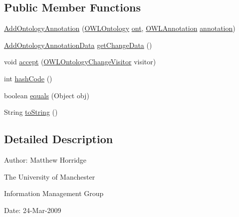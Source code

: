 \subsection*{Public Member Functions}
\begin{DoxyCompactItemize}
\item 
\hyperlink{classorg_1_1semanticweb_1_1owlapi_1_1model_1_1_add_ontology_annotation_a0f46a05b9e2e996d296d452b4db5042c}{Add\-Ontology\-Annotation} (\hyperlink{interfaceorg_1_1semanticweb_1_1owlapi_1_1model_1_1_o_w_l_ontology}{O\-W\-L\-Ontology} \hyperlink{classorg_1_1semanticweb_1_1owlapi_1_1model_1_1_o_w_l_ontology_change_a9b8b64f1cab33aae500db20e19186211}{ont}, \hyperlink{interfaceorg_1_1semanticweb_1_1owlapi_1_1model_1_1_o_w_l_annotation}{O\-W\-L\-Annotation} \hyperlink{classorg_1_1semanticweb_1_1owlapi_1_1model_1_1_annotation_change_a82541adcd6969af37b2d2c2663e7f69c}{annotation})
\item 
\hyperlink{classorg_1_1semanticweb_1_1owlapi_1_1change_1_1_add_ontology_annotation_data}{Add\-Ontology\-Annotation\-Data} \hyperlink{classorg_1_1semanticweb_1_1owlapi_1_1model_1_1_add_ontology_annotation_ad8d3980c8db90f8a94f7991ddfb53d11}{get\-Change\-Data} ()
\item 
void \hyperlink{classorg_1_1semanticweb_1_1owlapi_1_1model_1_1_add_ontology_annotation_a4b2e4593d2e963e70b7d0922edfb0421}{accept} (\hyperlink{interfaceorg_1_1semanticweb_1_1owlapi_1_1model_1_1_o_w_l_ontology_change_visitor}{O\-W\-L\-Ontology\-Change\-Visitor} visitor)
\item 
int \hyperlink{classorg_1_1semanticweb_1_1owlapi_1_1model_1_1_add_ontology_annotation_a61dd086ae34e13207b1f60fdb4b716cc}{hash\-Code} ()
\item 
boolean \hyperlink{classorg_1_1semanticweb_1_1owlapi_1_1model_1_1_add_ontology_annotation_a7c8e6b3f6a7c257bc3481c230ac7a525}{equals} (Object obj)
\item 
String \hyperlink{classorg_1_1semanticweb_1_1owlapi_1_1model_1_1_add_ontology_annotation_a3f83e0db974654ced714239fec02ea2c}{to\-String} ()
\end{DoxyCompactItemize}


\subsection{Detailed Description}
Author\-: Matthew Horridge\par
 The University of Manchester\par
 Information Management Group\par
 Date\-: 24-\/\-Mar-\/2009 

